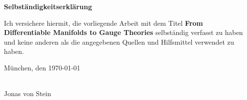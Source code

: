\documentclass[a4paper,11pt,twoside,openright]{report}
\newcommand{\thesistitleEng}{From Differentiable Manifolds to Gauge Theories}
\newcommand{\authorname}{Jonas von Stein}
\newcommand{\thesisdate}{\today}
\begin{document}

\cleardoublepage
{}



\clearpage{\pagestyle{empty}\cleardoublepage}
\thispagestyle{empty}

\vspace*{1cm}
{\huge \textbf{Selbst{\"a}ndigkeitserkl{\"a}rung}}\\
\vspace*{1cm}

Ich versichere hiermit, die vorliegende Arbeit mit dem Titel \textbf{\thesistitleEng} selbst{\"a}ndig verfasst zu haben und keine anderen als die angegebenen Quellen und Hilfsmittel verwendet zu haben.

M{\"u}nchen, den \thesisdate
\vspace*{1cm}
 
\noindent\makebox[5cm]{\hrulefill}\\
\vspace{0.3cm}
\authorname
\end{document}
